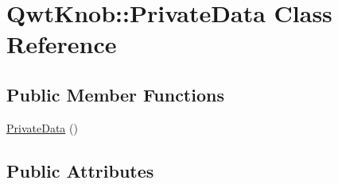 \hypertarget{class_qwt_knob_1_1_private_data}{\section{Qwt\-Knob\-:\-:Private\-Data Class Reference}
\label{class_qwt_knob_1_1_private_data}
}
\subsection*{Public Member Functions}
\begin{DoxyCompactItemize}
\item 
\hyperlink{class_qwt_knob_1_1_private_data_aecc406d6bedf51fa33eadd2916226735}{Private\-Data} ()
\end{DoxyCompactItemize}
\subsection*{Public Attributes}
